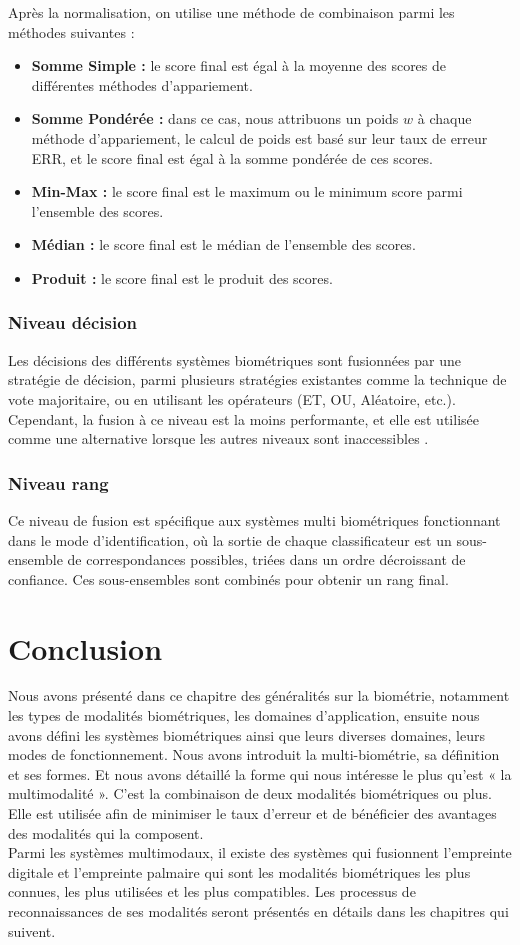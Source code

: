 Après la normalisation, on utilise une méthode de combinaison parmi les méthodes suivantes :
\begin{itemize}
	\item \textbf{Somme Simple :} le score final est égal à la moyenne des scores de différentes méthodes d'appariement.
	\item \textbf{Somme Pondérée :} dans ce cas, nous attribuons un poids $ w $ à chaque méthode d'appariement, le calcul de poids est basé sur leur taux de erreur ERR, et le score final est égal à la somme pondérée de ces scores.	
	\item \textbf{Min-Max :} le score final est le maximum ou le minimum score parmi l'ensemble des scores.
	\item \textbf{Médian :} le score final est le médian de l'ensemble des scores.
	\item \textbf{Produit :} le score final est le produit des scores.
\end{itemize}
\subsubsection{Niveau décision}
Les décisions des différents systèmes biométriques sont fusionnées par une stratégie de décision, parmi plusieurs stratégies existantes comme la technique de vote majoritaire, ou en utilisant les opérateurs (ET, OU, Aléatoire, etc.). Cependant, la fusion à ce niveau est la moins performante, et elle est utilisée comme une alternative lorsque les autres niveaux sont inaccessibles \citep{jain2004multibiometric}. 
\subsubsection{Niveau rang }
Ce niveau de fusion est spécifique aux systèmes multi biométriques fonctionnant dans le mode d'identification, où la sortie de chaque classificateur est un sous-ensemble de correspondances possibles, triées dans un ordre décroissant de confiance. Ces sous-ensembles sont combinés pour obtenir un rang final.	

\section{Conclusion}
Nous avons présenté dans ce chapitre des généralités sur la biométrie, notamment les types de modalités biométriques, les domaines d’application, ensuite nous avons défini les systèmes biométriques ainsi que leurs diverses domaines, leurs modes de fonctionnement. Nous avons introduit la multi-biométrie, sa définition et ses formes. Et nous avons détaillé la forme qui nous intéresse le plus qu’est « la multimodalité ». C'est la combinaison de deux modalités biométriques ou plus. Elle est utilisée afin de minimiser le taux d’erreur et de bénéficier des avantages des modalités qui la composent.
\\Parmi les systèmes multimodaux, il existe des systèmes qui fusionnent l’empreinte digitale et l’empreinte palmaire qui sont les modalités biométriques les plus connues, les plus utilisées et les plus compatibles. Les processus de reconnaissances de ses modalités seront présentés en détails dans les chapitres qui suivent.


